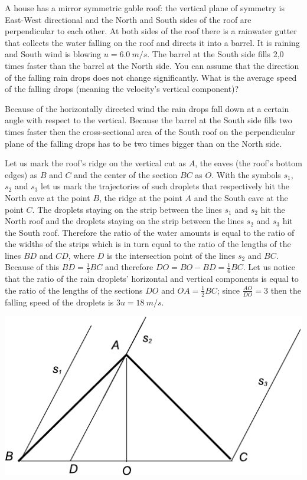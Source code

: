 A house has a mirror symmetric gable roof: the vertical plane of symmetry is East-West directional and the North and South sides of the roof are perpendicular to each other. At both sides of the roof there is a rainwater gutter that collects the water falling on the roof and directs it into a barrel. It is raining and South wind is blowing $u= \SI{6,0}{m/s}$. The barrel at the South side fills 2,0 times faster than the barrel at the North side. You can assume that the direction of the falling rain drops does not change significantly. What is the average speed of the falling drops (meaning the velocity’s vertical component)?

\hinteng
Because of the horizontally directed wind the rain drops fall down at a certain angle with respect to the vertical. Because the barrel at the South side fills two times faster then the cross-sectional area of the South roof on the perpendicular plane of the falling drops has to be two times bigger than on the North side.

\solueng
Let us mark the roof's ridge on the vertical cut as $A$, the eaves (the roof's bottom edges) as $B$ and $C$ and the center of the section $BC$ as $O$. With the symbols $s_1$, $s_2$ and $s_3$ let us mark the trajectories of such droplets that respectively hit the North eave at the point $B$, the ridge at the point $A$ and the South eave at the point $C$. The droplets staying on the strip between the lines $s_1$ and $s_2$ hit the North roof and the droplets staying on the strip between the lines $s_2$ and $s_3$ hit the South roof. Therefore the ratio of the water amounts is equal to the ratio of the widths of the strips which is in turn equal to the ratio of the lengths of the lines $BD$ and $CD$, where $D$ is the intersection point of the lines $s_2$ and $BC$. Because of this $BD=\frac 13 BC$ and therefore $DO=BO-BD=\frac 16 BC$. Let us notice that the ratio of the rain droplets' horizontal and vertical components is equal to the ratio of the lengths of the sections $DO$ and $OA=\frac 12 BC$; since $\frac {AO}{DO}=3$ then the falling speed of the droplets is $3u=\SI{18}{m/s}$.
\begin{center}
\includegraphics[width=0.5\linewidth]{2012-v2g-07-katus}
\end{center}
\probend